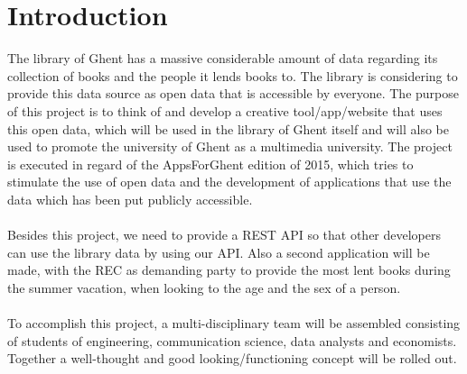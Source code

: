 \chapter{Introduction}

The library of Ghent has a massive considerable amount of data regarding its collection of books and the people it lends books to. The library is considering to provide this data source as open data that is accessible by everyone. The purpose of this project is to think of and develop a creative tool/app/website that uses this open data, which will be used in the library of Ghent itself and will also be used to promote the university of Ghent as a multimedia university. The project is executed in regard of the AppsForGhent edition of 2015, which tries to stimulate the use of open data and the development of applications that use the data which has been put publicly accessible.\\
\\
Besides this project, we need to provide a REST API so that other developers can use the library data by using our API. Also a second application will be made, with the REC as demanding party to provide the most lent books during the summer vacation, when looking to the age and the sex of a person.\\
\\
To accomplish this project, a multi-disciplinary team will be assembled consisting of students of engineering, communication science, data analysts and economists. Together a well-thought and good looking/functioning concept will be rolled out.